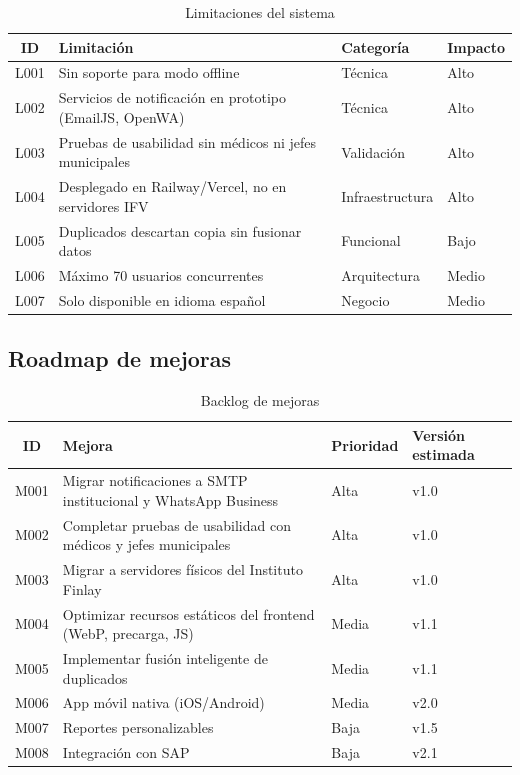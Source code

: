 \documentclass[12pt,letterpaper]{article}
\begin{document}
	\begin{table}[H]
\centering
\caption{Limitaciones del sistema}
\label{tab:limitaciones}
\begin{tabular}{|c|p{7.5cm}|p{2.8cm}|p{2.8cm}|}
\hline
\textbf{ID} & \textbf{Limitación} & \textbf{Categoría} & \textbf{Impacto} \\ \hline
L001 & Sin soporte para modo offline & Técnica & Alto \\ \hline
L002 & Servicios de notificación en prototipo (EmailJS, OpenWA) & Técnica & Alto \\ \hline
L003 & Pruebas de usabilidad sin médicos ni jefes municipales & Validación & Alto \\ \hline
L004 & Desplegado en Railway/Vercel, no en servidores IFV & Infraestructura & Alto \\ \hline
L005 & Duplicados descartan copia sin fusionar datos & Funcional & Bajo \\ \hline
L006 & Máximo 70 usuarios concurrentes & Arquitectura & Medio \\ \hline
L007 & Solo disponible en idioma español & Negocio & Medio \\ \hline
\end{tabular}
\end{table}
	
	\subsection{Roadmap de mejoras}
	
	\begin{table}[H]
\centering
\caption{Backlog de mejoras}
\label{tab:mejoras}
\begin{tabular}{|c|p{7cm}|p{2.5cm}|p{2.5cm}|}
\hline
\textbf{ID} & \textbf{Mejora} & \textbf{Prioridad} & \textbf{Versión estimada} \\ \hline
M001 & Migrar notificaciones a SMTP institucional y WhatsApp Business & Alta & v1.0 \\ \hline
M002 & Completar pruebas de usabilidad con médicos y jefes municipales & Alta & v1.0 \\ \hline
M003 & Migrar a servidores físicos del Instituto Finlay & Alta & v1.0 \\ \hline
M004 & Optimizar recursos estáticos del frontend (WebP, precarga, JS) & Media & v1.1 \\ \hline
M005 & Implementar fusión inteligente de duplicados & Media & v1.1 \\ \hline
M006 & App móvil nativa (iOS/Android) & Media & v2.0 \\ \hline
M007 & Reportes personalizables & Baja & v1.5 \\ \hline
M008 & Integración con SAP & Baja & v2.1 \\ \hline
\end{tabular}
\end{table}
\end{document}
